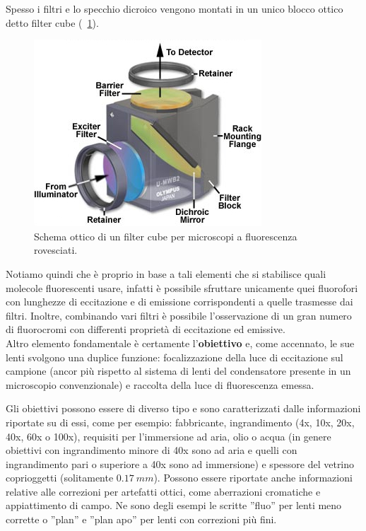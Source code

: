 Spesso i filtri e lo specchio dicroico vengono montati in un unico blocco ottico detto filter cube (\figurename~\ref{fig:cube}). 

\begin{figure}[!ht]
 \centering
 \includegraphics[scale=.50]{img/CAP2cube.jpg}
 \caption{\small{Schema ottico di un filter cube per microscopi a fluorescenza rovesciati.}}
 \label{fig:cube}
\end{figure}

Notiamo quindi che è proprio in base a tali elementi che si stabilisce quali molecole fluorescenti usare, infatti è possibile sfruttare unicamente quei fluorofori con lunghezze di eccitazione e di emissione corrispondenti a quelle trasmesse dai filtri. Inoltre, combinando vari filtri è possibile l'osservazione di un gran numero di fluorocromi con differenti proprietà di eccitazione ed emissive. \\

Altro elemento fondamentale è certamente l'\textbf{obiettivo} e, come accennato, le sue lenti svolgono una duplice funzione: focalizzazione della luce di eccitazione sul campione (ancor più rispetto al sistema di lenti del condensatore presente in un microscopio convenzionale) e raccolta della luce di fluorescenza emessa. 

Gli obiettivi possono essere di diverso tipo e sono caratterizzati dalle informazioni riportate su di essi, come per esempio: fabbricante, ingrandimento (4x, 10x, 20x, 40x, 60x o 100x), requisiti per l'immersione ad aria, olio o acqua (in genere obiettivi con ingrandimento minore di 40x sono ad aria e quelli con ingrandimento pari o superiore a 40x sono ad immersione) e spessore del vetrino coprioggetti (solitamente $0.17\ mm$). Possono essere riportate anche informazioni relative alle correzioni per artefatti ottici, come aberrazioni cromatiche e appiattimento di campo. Ne sono degli esempi le scritte ''fluo'' per lenti meno corrette o ''plan'' e ''plan apo'' per lenti con correzioni più fini. 

